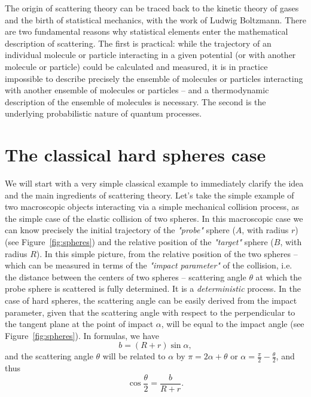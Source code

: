 The origin of scattering theory can be traced back to the kinetic theory of gases and the birth of statistical mechanics, with the work of Ludwig Boltzmann. There are two fundamental reasons why statistical elements enter the mathematical description of scattering. The first is practical: while the trajectory of an individual molecule or particle interacting in a given potential (or with another molecule or particle) could be calculated and measured, it is in practice impossible to describe precisely the ensemble of molecules or particles interacting with another ensemble of molecules or particles -- and a thermodynamic description of the ensemble of molecules is necessary. The second is the underlying probabilistic nature of quantum processes. 

\section{The classical hard spheres case}

We will start with a very simple classical example to immediately clarify the idea and the main ingredients of scattering theory. Let's take the simple example of two macroscopic objects interacting via a simple mechanical collision process, as the simple case of the elastic collision of two  spheres. In this macroscopic case we can know precisely the initial trajectory of the {\it "probe"} sphere ($A$, with radius $r$) (see Figure~\ref{fig:spheres}) and the relative position of the  {\it "target"} sphere ($B$, with radius $R$). In this simple picture, from the relative position of the two spheres -- which can be measured in terms of the {\it "impact parameter"} of the collision, i.e. the distance between the centers of two spheres -- scattering angle $\theta$ at which the probe sphere is scattered is fully determined. It is a {\it deterministic} process. In the case of hard spheres, the scattering angle can be easily derived from the impact parameter, given that the scattering angle with respect to the perpendicular to the tangent plane at the point of impact $\alpha$, will be equal to the impact angle (see Figure~\ref{fig:spheres}). In formulas, we have
\[ b = (R+r) \sin \alpha,\]
and the scattering angle $\theta$ will be related to $\alpha$ by $\pi = 2\alpha + \theta$ or $\alpha = \frac{\pi}{2} - \frac{\theta}{2}$, and thus
\begin{equation}
\label{eq:spheres}
\cos \frac{\theta}{2} = \frac{b}{R+r}.
\end{equation}


